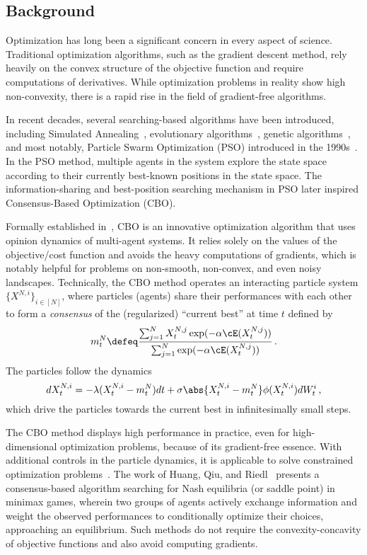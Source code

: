 \documentclass{amsart}
\begin{document}
\subsection{Background}

Optimization has long been a significant concern in every aspect of science.
Traditional optimization algorithms, such as the gradient descent method, rely heavily on the convex structure of the objective function and require computations of derivatives.
While optimization problems in reality show high non-convexity, there is a rapid rise in the field of gradient-free algorithms.

In recent decades, several searching-based algorithms have been introduced, including Simulated Annealing~\cite{AartsKorst1991}, evolutionary algorithms~\cite{BaeckFogelMichalewicz1997,Fogel2006}, genetic algorithms~\cite{Holland1992,ReevesRowe2002}, 
and most notably, Particle Swarm Optimization (PSO) introduced in the 1990s~\cite{KennedyEberhart1995,ShiEberhart1998}. 
In the PSO method, multiple agents in the system explore the state space according to their currently best-known positions in the state space.
The information-sharing and best-position searching mechanism in PSO later inspired Consensus-Based Optimization (CBO). 

Formally established in~\cite{PinnauTotzeckTseMartin2017}, CBO is an innovative optimization algorithm that uses opinion dynamics of multi-agent systems. 
It relies solely on the values of the objective/cost function and avoids the heavy computations of gradients, which is notably helpful for problems on non-smooth, non-convex, and even noisy landscapes.
Technically, the CBO method operates an interacting particle system $\{X^{N,i}\}_{i \in [N]}$, where particles (agents) share their performances with each other to form a \emph{consensus} of the (regularized) ``current best'' at time $t$ defined by  
\begin{equation*}
	m^N_t \defeq \frac{\sum_{j=1}^N X^{N,j}_t \exp(-\alpha \cE(X^{N,j}_t))}{\sum_{j=1}^N \exp(-\alpha \cE(X^{N,j}_t))} \,.
\end{equation*}
The particles follow the dynamics
\begin{equation*}
    d X^{N,i}_t = - \lambda (X^{N,i}_t - m^N_t) dt + \sigma \abs{X^{N,i}_t - m^N_t} \phi(X^{N,i}_t) dW^i_t \,,
\end{equation*}
which drive the particles towards the current best in infinitesimally small steps.

The CBO method displays high performance in practice, even for high-dimensional optimization problems, because of its gradient-free essence. 
With additional controls in the particle dynamics, it is applicable to solve constrained optimization problems~\cite{CarrilloJinZhangZhu2024}.
The work of Huang, Qiu, and Riedl~\cite{HuangQiuRiedl2024} presents a consensus-based algorithm searching for Nash equilibria (or saddle point) in minimax games, wherein two groups of agents actively exchange information and weight the observed performances to conditionally optimize their choices, approaching an equilibrium. 
Such methods do not require the convexity-concavity of objective functions and also avoid computing gradients.
\end{document}
